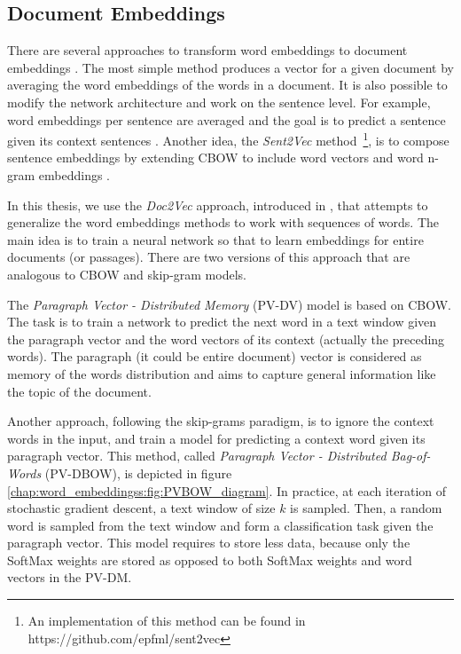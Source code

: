 \subsection{Document Embeddings} \label{chap:word_embeddings:sec:PVBOW} 
 
There are several approaches to transform word embeddings to document embeddings \parencite{mitra2018introduction,mikolov2013distributed}. The most simple method produces a vector for a given document by averaging the word embeddings of the words in a document. It is also possible to modify the network architecture and work on the sentence level. For example, word embeddings per sentence are averaged and the goal is to predict a sentence given its context sentences . Another idea, the \textit{Sent2Vec} method~\footnote{An implementation of this method can be found in https://github.com/epfml/sent2vec}, is to compose sentence embeddings by extending CBOW to include word vectors and word n-gram embeddings .

In this thesis, we use the \textit{Doc2Vec} approach, introduced in , that attempts to generalize the word embeddings methods to work with sequences of words. The main idea is to train a neural network so that to learn embeddings for entire documents (or passages). There are two versions of this approach that are analogous to CBOW and skip-gram models. 


The \textit{Paragraph Vector - Distributed Memory} (PV-DV) model is based on CBOW. The task is to train a network to predict the next word in a text window given the paragraph vector and the word vectors of its context (actually the preceding words). The paragraph (it could be entire document) vector is considered as memory of the words distribution and aims to capture general information like the topic of the document. 

Another approach, following the skip-grams paradigm, is to ignore the context words in the input, and train a model for predicting a context word given its paragraph vector. This method, called \textit{Paragraph Vector - Distributed Bag-of-Words} (PV-DBOW), is depicted in figure \ref{chap:word_embeddingss:fig:PVBOW_diagram}. In practice, at each iteration of stochastic gradient descent, a text window of size $k$ is sampled. Then, a random word is sampled from the text window and form a classification task given the paragraph vector. This model requires to store less data, because only the SoftMax weights are stored as opposed to both SoftMax weights and word vectors in the PV-DM. 


